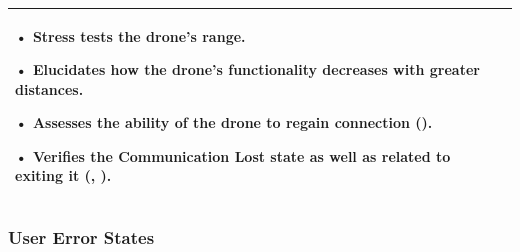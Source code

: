 \documentclass[12pt, titlepage]{article}
\begin{document}
\begin{table}[!h]
\begin{center}
\begin{tabular}{ | m{3.2cm} | m{12.2cm} | }
• Stress tests the drone's range.

• Elucidates how the drone's functionality decreases with greater distances. 

• Assesses the ability of the drone to regain connection (\nameref{SR_007}).

• Verifies the Communication Lost state as well as related to exiting it (\nameref{STA_010}, \nameref{TRANS_010}). 

\\ 
\hline
\end{tabular}
\end{center}
\end{table}

\clearpage

\subsubsection{User Error States}
\label{usererrorTests}
\end{document}
